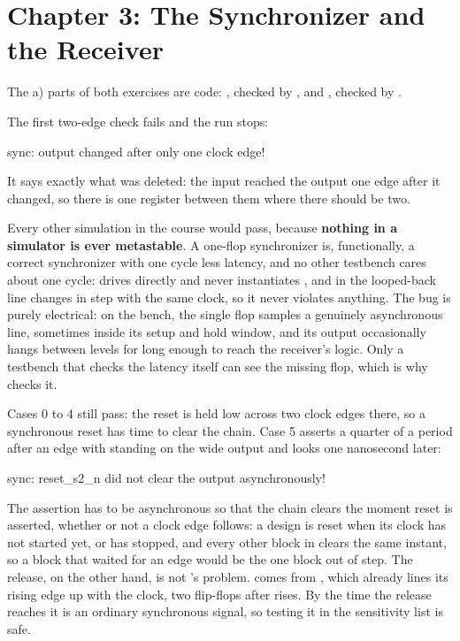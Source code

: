 
\section{Chapter 3: The Synchronizer and the Receiver}
\label{sol:c3}
The a) parts of both exercises are code: , checked by , and
, checked by .

 The first two-edge check fails and the run stops:

\begin{console}
sync: output changed after only one clock edge!
\end{console}

\noindent It says exactly what was deleted: the input reached the output one edge after it changed,
so there is one register between them where there should be two.

Every other simulation in the course would pass, because \textbf{nothing in a simulator is ever
metastable}. A one-flop synchronizer is, functionally, a correct synchronizer with one cycle less
latency, and no other testbench cares about one cycle:  drives 
directly and never instantiates , and in  the looped-back line changes
in step with the same clock, so it never violates anything. The bug is purely electrical: on the
bench, the single flop samples a genuinely asynchronous line, sometimes inside its setup and hold
window, and its output occasionally hangs between levels for long enough to reach the receiver's
logic. Only a testbench that checks the latency itself can see the missing flop, which is why
 checks it.

 Cases 0 to 4 still pass: the reset is held low across two clock edges there, so a synchronous
reset has time to clear the chain. Case 5 asserts  a quarter of a period after an
edge with  standing on the wide output and looks one nanosecond later:

\begin{console}
sync: reset_s2_n did not clear the output asynchronously!
\end{console}

\noindent The assertion has to be asynchronous so that the chain clears the moment reset is asserted,
whether or not a clock edge follows: a design is reset when its clock has not started yet, or has
stopped, and every other block in  clears the same instant, so a block that waited for an
edge would be the one block out of step. The release, on the other hand, is not 's
problem.  comes from , which already lines its rising edge up with
the clock, two flip-flops after  rises. By the time the release reaches 
it is an ordinary synchronous signal, so testing it in the sensitivity list is safe.

